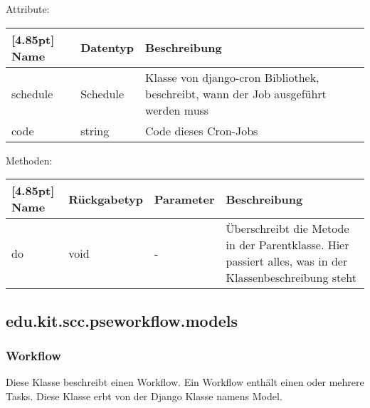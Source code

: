 		Attribute:
		\begin{center}
			\renewcommand{\arraystretch}{1.5}
			\setlength\tabcolsep{5pt}
			\begin{tabularx}{\textwidth}{|l|l|X|}
				\hline
				\rowcolor[gray]{0.75}[4.85pt]					
				Name & Datentyp & Beschreibung \\ \hline
				schedule & Schedule & Klasse von django-cron Bibliothek, beschreibt, wann der Job ausgeführt werden muss \\ \hline
				code & string & Code dieses Cron-Jobs \\ \hline
			\end{tabularx}
		\end{center}
		
		Methoden:
		\begin{center}
			\setlength\tabcolsep{5pt}
			\renewcommand{\arraystretch}{1.5}
			
			\begin{tabularx}{\textwidth}{|l|l|l|X|}
				\hline
				\rowcolor[gray]{0.90}[4.85pt]
				Name & Rückgabetyp & Parameter & Beschreibung \\ \hline
				do & void & - & Überschreibt die Metode in der Parentklasse. Hier passiert alles, was in der Klassenbeschreibung steht \\ \hline
			\end{tabularx}
		\end{center}


	\newpage
	

		\subsection{edu.kit.scc.pseworkflow.models}
			\subsubsection{Workflow}
			Diese Klasse beschreibt einen \gls{Workflow}. Ein Workflow enthält einen oder mehrere \gls{Task}s. \newline
			Diese Klasse erbt von der Django Klasse namens \glqq Model\grqq.\newline
					
